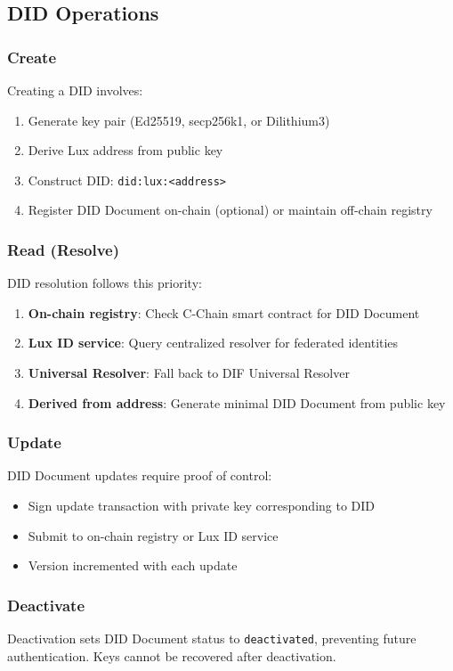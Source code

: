 \subsection{DID Operations}

\subsubsection{Create}

Creating a DID involves:
\begin{enumerate}
  \item Generate key pair (Ed25519, secp256k1, or Dilithium3)
  \item Derive Lux address from public key
  \item Construct DID: \texttt{did:lux:<address>}
  \item Register DID Document on-chain (optional) or maintain off-chain registry
\end{enumerate}

\subsubsection{Read (Resolve)}

DID resolution follows this priority:
\begin{enumerate}
  \item \textbf{On-chain registry}: Check C-Chain smart contract for DID Document
  \item \textbf{Lux ID service}: Query centralized resolver for federated identities
  \item \textbf{Universal Resolver}: Fall back to DIF Universal Resolver \cite{universal-resolver}
  \item \textbf{Derived from address}: Generate minimal DID Document from public key
\end{enumerate}

\subsubsection{Update}

DID Document updates require proof of control:
\begin{itemize}
  \item Sign update transaction with private key corresponding to DID
  \item Submit to on-chain registry or Lux ID service
  \item Version incremented with each update
\end{itemize}

\subsubsection{Deactivate}

Deactivation sets DID Document status to \texttt{deactivated}, preventing future authentication. Keys cannot be recovered after deactivation.

